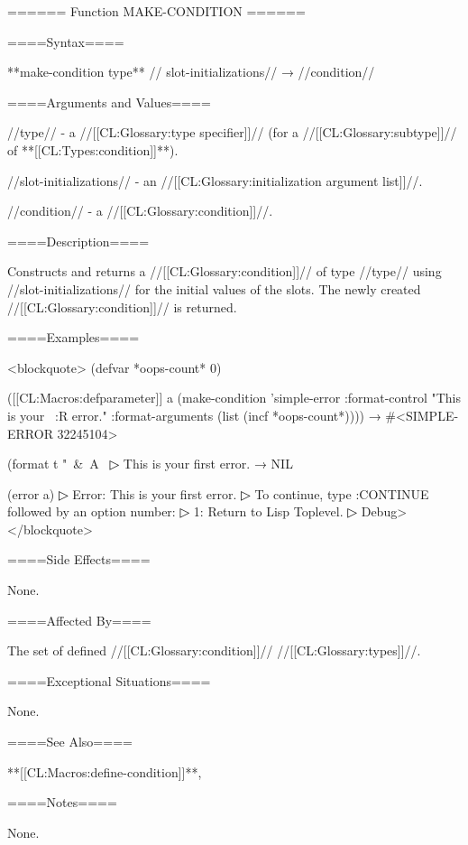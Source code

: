 ====== Function MAKE-CONDITION ======

====Syntax====

**make-condition {type** //\rest} slot-initializations// → //condition//

====Arguments and Values====

//type// - a //[[CL:Glossary:type specifier]]// (for a //[[CL:Glossary:subtype]]// of **[[CL:Types:condition]]**).

//slot-initializations// - an //[[CL:Glossary:initialization argument list]]//.

//condition// - a //[[CL:Glossary:condition]]//.

====Description====

Constructs and returns a //[[CL:Glossary:condition]]// of type //type// using //slot-initializations// for the initial values of the slots. The newly created //[[CL:Glossary:condition]]// is returned.

====Examples====

<blockquote> (defvar *oops-count* 0)

([[CL:Macros:defparameter]] a (make-condition 'simple-error :format-control "This is your ~:R error." :format-arguments (list (incf *oops-count*)))) → #<SIMPLE-ERROR 32245104>

(format t "~&~A~
▷ This is your first error. → NIL

(error a)
▷ Error: This is your first error.
▷ To continue, type :CONTINUE followed by an option number:
▷ 1: Return to Lisp Toplevel.
▷ Debug> </blockquote>

====Side Effects====

None.

====Affected By====

The set of defined //[[CL:Glossary:condition]]// //[[CL:Glossary:types]]//.

====Exceptional Situations====

None.

====See Also====

**[[CL:Macros:define-condition]]**, {\secref\ConditionSystemConcepts}

====Notes====

None.

